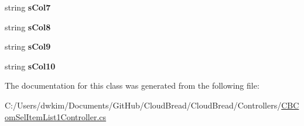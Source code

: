 \begin{DoxyCompactItemize}
\item 
string {\bfseries s\+Col7}\hypertarget{class_cloud_bread_1_1_controllers_1_1_c_b_com_sel_item_list1_controller_1_1_model_a7d68635e0fd94177f54ac6eedc978fd2}{}\label{class_cloud_bread_1_1_controllers_1_1_c_b_com_sel_item_list1_controller_1_1_model_a7d68635e0fd94177f54ac6eedc978fd2}

\item 
string {\bfseries s\+Col8}\hypertarget{class_cloud_bread_1_1_controllers_1_1_c_b_com_sel_item_list1_controller_1_1_model_ad775016a811947eb9d8f9ea03cb6f957}{}\label{class_cloud_bread_1_1_controllers_1_1_c_b_com_sel_item_list1_controller_1_1_model_ad775016a811947eb9d8f9ea03cb6f957}

\item 
string {\bfseries s\+Col9}\hypertarget{class_cloud_bread_1_1_controllers_1_1_c_b_com_sel_item_list1_controller_1_1_model_a6ad00b298ff26eef5696509e63269ac5}{}\label{class_cloud_bread_1_1_controllers_1_1_c_b_com_sel_item_list1_controller_1_1_model_a6ad00b298ff26eef5696509e63269ac5}

\item 
string {\bfseries s\+Col10}\hypertarget{class_cloud_bread_1_1_controllers_1_1_c_b_com_sel_item_list1_controller_1_1_model_adc53a9c482d3e25637183bb7c4528e44}{}\label{class_cloud_bread_1_1_controllers_1_1_c_b_com_sel_item_list1_controller_1_1_model_adc53a9c482d3e25637183bb7c4528e44}

\end{DoxyCompactItemize}


The documentation for this class was generated from the following file\+:\begin{DoxyCompactItemize}
\item 
C\+:/\+Users/dwkim/\+Documents/\+Git\+Hub/\+Cloud\+Bread/\+Cloud\+Bread/\+Controllers/\hyperlink{_c_b_com_sel_item_list1_controller_8cs}{C\+B\+Com\+Sel\+Item\+List1\+Controller.\+cs}\end{DoxyCompactItemize}
